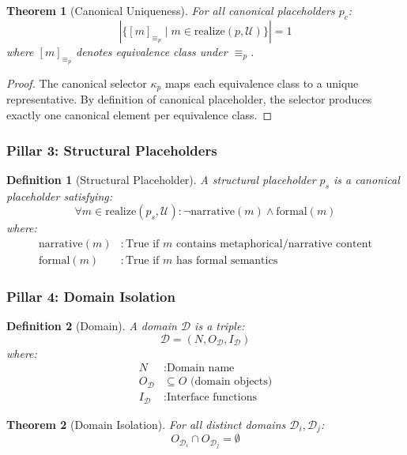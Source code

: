 \documentclass[12pt]{article}
\newtheorem{theorem}{Theorem}
\newtheorem{definition}{Definition}
\begin{document}
\begin{theorem}[Canonical Uniqueness]
For all canonical placeholders $p_c$:
\[
|\{ [m]_{\equiv_p} \mid m \in \text{realize}(p, \mathcal{U}) \}| = 1
\]
where $[m]_{\equiv_p}$ denotes equivalence class under $\equiv_p$.
\end{theorem}

\begin{proof}
The canonical selector $\kappa_p$ maps each equivalence class to a unique representative. By definition of canonical placeholder, the selector produces exactly one canonical element per equivalence class.
\end{proof}

\subsubsection{Pillar 3: Structural Placeholders}

\begin{definition}[Structural Placeholder]
A structural placeholder $p_s$ is a canonical placeholder satisfying:
\[
\forall m \in \text{realize}(p_s, \mathcal{U}): \neg \text{narrative}(m) \land \text{formal}(m)
\]
where:
\begin{align*}
\text{narrative}(m) & : \text{True if $m$ contains metaphorical/narrative content} \\
\text{formal}(m) & : \text{True if $m$ has formal semantics}
\end{align*}
\end{definition}

\subsubsection{Pillar 4: Domain Isolation}

\begin{definition}[Domain]
A domain $\mathcal{D}$ is a triple:
\[
\mathcal{D} = (N, O_{\mathcal{D}}, I_{\mathcal{D}})
\]
where:
\begin{align*}
N & : \text{Domain name} \\
O_{\mathcal{D}} & \subseteq O \text{ (domain objects)} \\
I_{\mathcal{D}} & : \text{Interface functions}
\end{align*}
\end{definition}

\begin{theorem}[Domain Isolation]
For all distinct domains $\mathcal{D}_i, \mathcal{D}_j$:
\[
O_{\mathcal{D}_i} \cap O_{\mathcal{D}_j} = \emptyset
\]
\end{theorem}
\end{document}
